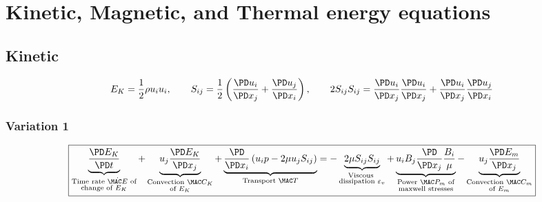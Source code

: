 \documentclass[11pt]{article}
\begin{document}
\doublespacing
\MOONSTITLE
\maketitle

\section{Kinetic, Magnetic, and Thermal energy equations}

\subsection{Kinetic}
\begin{equation}
	E_K = \frac{1}{2} \rho u_i u_i
	,\qquad
	S_{ij} = \frac{1}{2} \left( \frac{\PD u_i}{\PD x_j} + \frac{\PD u_j}{\PD x_i} \right)
	,\qquad
	2S_{ij}S_{ij} = \frac{\PD u_i}{\PD x_j} \frac{\PD u_i}{\PD x_j}
	+ \frac{\PD u_i}{\PD x_j} \frac{\PD u_j}{\PD x_i}
\end{equation}
\subsubsection{Variation 1}
\begin{equation}
	\boxed{
	\underbrace{\frac{\PD E_K}{\PD t}}_{\substack{\text{Time rate $\dot{\MAC E}$ of} \\ \text{change of $E_K$}}} +
	\underbrace{u_j \frac{\PD E_K}{\PD x_j}}_
	{\substack{\text{Convection } \MAC C_K \\\text{of $E_K$}}}
	+
	\underbrace{\frac{\PD}{\PD x_i} \left( u_i p - 2 \mu u_j S_{ij} \right)}_{\text{Transport } \MAC T} =
	- \underbrace{2 \mu S_{ij} S_{ij}}_{\substack{\text{Viscous } \\ \text{dissipation } \varepsilon_v}}
	+ \underbrace{u_i B_j \frac{\PD}{\PD x_j} \frac{B_i}{\mu}}_
	{\substack{\text{Power $\MAC P_{m}$ of}\\\text{maxwell stresses}}}
	- \underbrace{u_j \frac{\PD E_m}{\PD x_j}}_
	{\substack{\text{Convection $\MAC C_m$}\\\text{of $E_m$}}}
	}
\end{equation}
\end{document}
